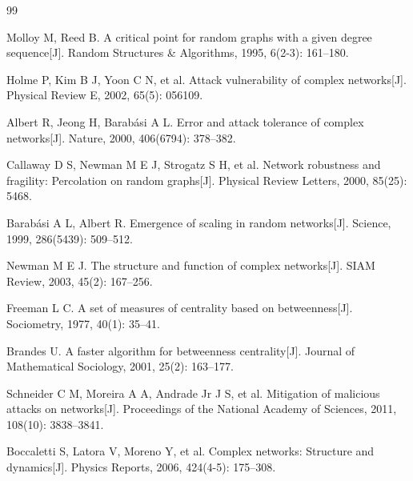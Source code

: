 \documentclass[12pt,a4paper]{article}
\begin{document}
\begin{thebibliography}{99}

Molloy M, Reed B. A critical point for random graphs with a given degree sequence[J]. Random Structures \& Algorithms, 1995, 6(2-3): 161--180.

Holme P, Kim B J, Yoon C N, et al. Attack vulnerability of complex networks[J]. Physical Review E, 2002, 65(5): 056109.

Albert R, Jeong H, Barab\'asi A L. Error and attack tolerance of complex networks[J]. Nature, 2000, 406(6794): 378--382.

Callaway D S, Newman M E J, Strogatz S H, et al. Network robustness and fragility: Percolation on random graphs[J]. Physical Review Letters, 2000, 85(25): 5468.

Barab\'asi A L, Albert R. Emergence of scaling in random networks[J]. Science, 1999, 286(5439): 509--512.

Newman M E J. The structure and function of complex networks[J]. SIAM Review, 2003, 45(2): 167--256.

Freeman L C. A set of measures of centrality based on betweenness[J]. Sociometry, 1977, 40(1): 35--41.

Brandes U. A faster algorithm for betweenness centrality[J]. Journal of Mathematical Sociology, 2001, 25(2): 163--177.

Schneider C M, Moreira A A, Andrade Jr J S, et al. Mitigation of malicious attacks on networks[J]. Proceedings of the National Academy of Sciences, 2011, 108(10): 3838--3841.

Boccaletti S, Latora V, Moreno Y, et al. Complex networks: Structure and dynamics[J]. Physics Reports, 2006, 424(4-5): 175--308.

\end{thebibliography}
\end{document}
